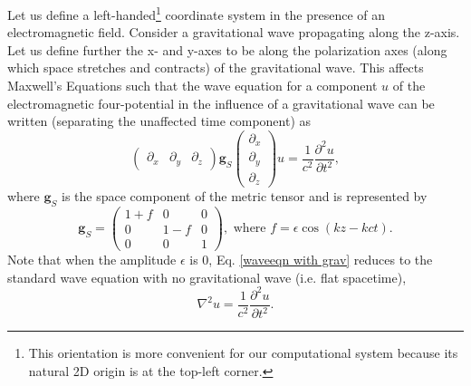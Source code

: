 \documentclass{article}
\begin{document}
Let us define a left-handed\footnote{This orientation is more convenient for our computational system because its natural 2D origin is at the top-left corner.} coordinate system in the presence of an electromagnetic field. Consider a gravitational wave propagating along the z-axis. Let us define further the x- and y-axes to be along the polarization axes (along which space stretches and contracts) of the gravitational wave. This affects Maxwell's Equations such that the wave equation for a component $u$ of the electromagnetic four-potential in the influence of a gravitational wave can be written (separating the unaffected time component) as
\begin{equation} \label{waveeqn with grav}
\begin{pmatrix}\partial_x & \partial_y & \partial_z\end{pmatrix} 
\textbf{g}_S
\begin{pmatrix} \partial_x \\ \partial_y \\ \partial_z \end{pmatrix}
u
=\frac{1}{c^2}\frac{\partial^2 u}{\partial t^2},
\end{equation}
where $\textbf{g}_S$ is the space component of the metric tensor and is represented by
\begin{equation} \label{M}
\textbf{g}_S=\begin{pmatrix}
1+f & 0 & 0 \\
0 & 1-f & 0 \\
0 & 0 & 1
\end{pmatrix},
\text{ \ \ \ where } f=\epsilon \cos(kz-kct).
\end{equation}
Note that when the amplitude $\epsilon$ is 0, Eq. \ref{waveeqn with grav} reduces to the standard wave equation with no gravitational wave (i.e. flat spacetime),
\begin{equation} \label{waveeqn flat}
\nabla^2u=\frac{1}{c^2}\frac{\partial^2u}{\partial t^2}.
\end{equation}
\end{document}
